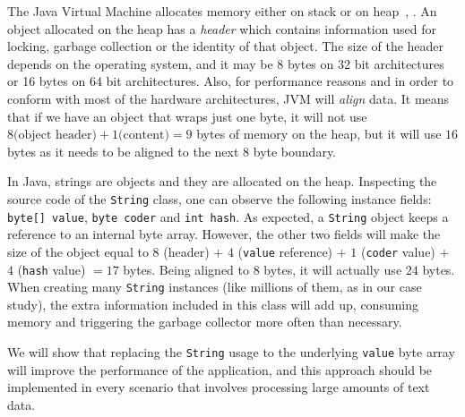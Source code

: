 \documentclass[a4paper,twoside]{article}
\begin{document}
The Java Virtual Machine allocates memory either on stack or on heap~\cite{lindholm:2014}, \cite{gosling:2014}.
An object allocated on the heap has a {\textit{header}} which contains information used for locking, garbage collection or the identity of that object.
The size of the header depends on the operating system, and it may be 8 bytes on 32 bit architectures or 16 bytes on 64 bit architectures.
Also, for performance reasons and in order to conform with most of the hardware architectures, JVM will {\textit{align}} data.
It means that if we have an object that wraps just one byte, it will not use $8 \text{(object header)} + 1 \text{(content)} = 9 $ bytes of memory on the heap, but it will use $16$ bytes as it needs to be aligned to the next $8$ byte boundary.

In Java, strings are objects and they are allocated on the heap.
Inspecting the source code of the \texttt{String} class, one can observe the following instance fields:
{\tt byte[] value}, {\tt byte coder} and  {\tt int hash}.
As expected, a \texttt{String} object keeps a reference to an internal byte array.
However, the other two fields will make the size of the object equal to $8$ (header) $+$ $4$ (\texttt{value} reference) $+$ $1$  (\texttt{coder} value) $+$ $4$ (\texttt{hash} value) $= 17$ bytes.
Being aligned to $8$ bytes, it will actually use $24$ bytes.
When creating many \texttt{String} instances (like millions of them, as in our case study), the extra information included in this class will add up, consuming memory and  triggering the garbage collector more often than necessary. 

We will show that replacing the \texttt{String} usage to the underlying \texttt{value} byte array will improve the performance of the application, and this approach should be implemented in every scenario that involves processing large amounts of text data.
\end{document}
